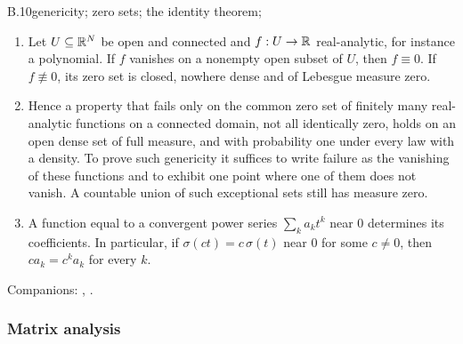 \begin{auxresult}{B.10}{genericity; zero sets; the identity theorem}{\citep{xmityagin2020zero};
\citep[Ch.~1 and 2]{xkrantz2002primer}}
\begin{enumerate}[label=(\alph*)]
  \item Let $U\subseteq\mathbb{R}^N$ be open and connected and $f:U\to\mathbb{R}$ real-analytic, for instance a polynomial. If $f$
    vanishes on a nonempty open subset of $U$, then $f\equiv0$. If $f\not\equiv0$, its zero set is closed, nowhere dense
    and of Lebesgue measure zero.
  \item Hence a property that fails only on the common zero set of finitely many real-analytic functions on a connected
    domain, not all identically zero, holds on an open dense set of full measure, and with probability one under every
    law with a density. To prove such genericity it suffices to write failure as the vanishing of these functions and to
    exhibit one point where one of them does not vanish. A countable union of such exceptional sets still has measure
    zero.
  \item A function equal to a convergent power series $\sum_ka_kt^k$ near $0$ determines its coefficients. In
    particular, if $\sigma(ct)=c\,\sigma(t)$ near $0$ for some $c\ne0$, then $ca_k=c^ka_k$ for every $k$.
\end{enumerate}
\end{auxresult}
\noindent Companions: , .

\subsubsection{Matrix analysis}

